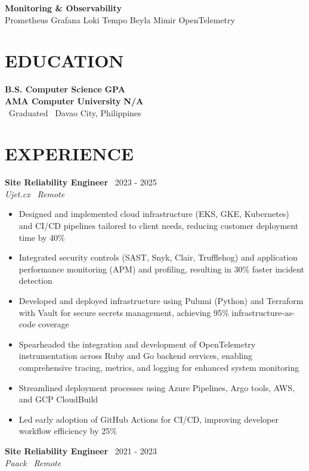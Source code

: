 \documentclass[11pt,a4paper]{article}
\newcommand{\resumeSubheading}[4]{
  \vspace{2pt}
  \textbf{#1} \hfill #2 \\
  \textit{#3} \hfill \textit{#4}
  \vspace{2pt}
}
\begin{document}
\textbf{Monitoring \& Observability}\\
Prometheus \quad Grafana \quad Loki \quad Tempo \quad Beyla \quad Mimir \quad OpenTelemetry

\section*{EDUCATION}

\textbf{B.S. Computer Science} \hfill \textbf{GPA}\\
\textbf{AMA Computer University} \hfill \textbf{N/A}\\
\faCalendar\ Graduated \quad \faMapMarker\ Davao City, Philippines

\section*{EXPERIENCE}

\resumeSubheading
{Site Reliability Engineer}{\faCalendar\ 2023 - 2025}
{Ujet.cx}{\faMapMarker\ Remote}

\begin{itemize}[leftmargin=*, itemsep=1pt, parsep=0pt, topsep=2pt]
    \item Designed and implemented cloud infrastructure (EKS, GKE, Kubernetes) and CI/CD pipelines tailored to client needs, reducing customer deployment time by 40\%
    \item Integrated security controls (SAST, Snyk, Clair, Trufflehog) and application performance monitoring (APM) and profiling, resulting in 30\% faster incident detection
    \item Developed and deployed infrastructure using Pulumi (Python) and Terraform with Vault for secure secrets management, achieving 95\% infrastructure-as-code coverage
    \item Spearheaded the integration and development of OpenTelemetry instrumentation across Ruby and Go backend services, enabling comprehensive tracing, metrics, and logging for enhanced system monitoring
    \item Streamlined deployment processes using Azure Pipelines, Argo tools, AWS, and GCP CloudBuild
    \item Led early adoption of GitHub Actions for CI/CD, improving developer workflow efficiency by 25\%
\end{itemize}

\resumeSubheading
{Site Reliability Engineer}{\faCalendar\ 2021 - 2023}
{Paack}{\faMapMarker\ Remote}
\end{document}
